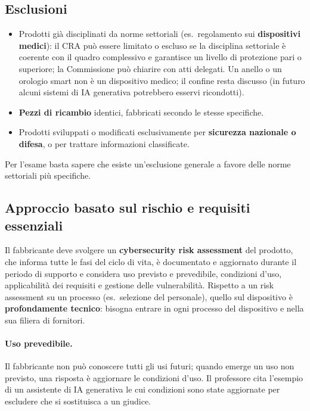 \subsection{Esclusioni}
\begin{itemize}
  \item Prodotti già disciplinati da norme settoriali (es.\ regolamento sui \textbf{dispositivi medici}):
    il CRA può essere limitato o escluso se la disciplina settoriale è coerente con il quadro complessivo e
    garantisce un livello di protezione pari o superiore; la Commissione può chiarire con atti delegati.
    Un anello o un orologio smart non è un dispositivo medico; il confine resta discusso (in futuro alcuni
    sistemi di IA generativa potrebbero esservi ricondotti).
  \item \textbf{Pezzi di ricambio} identici, fabbricati secondo le stesse specifiche.
  \item Prodotti sviluppati o modificati esclusivamente per \textbf{sicurezza nazionale o difesa}, o per
    trattare informazioni classificate.
\end{itemize}
Per l'esame basta sapere che esiste un'esclusione generale a favore delle norme settoriali più specifiche.

\subsection{Approccio basato sul rischio e requisiti essenziali}
Il fabbricante deve svolgere un \textbf{cybersecurity risk assessment} del prodotto, che informa tutte le
fasi del ciclo di vita, è documentato e aggiornato durante il periodo di supporto e considera uso previsto e
prevedibile, condizioni d'uso, applicabilità dei requisiti e gestione delle vulnerabilità. Rispetto a un
risk assessment su un processo (es.\ selezione del personale), quello sul dispositivo è
\textbf{profondamente tecnico}: bisogna entrare in ogni processo del dispositivo e nella sua filiera di
fornitori.

\paragraph{Uso prevedibile.} Il fabbricante non può conoscere tutti gli usi futuri; quando emerge un uso non
previsto, una risposta è aggiornare le condizioni d'uso. Il professore cita l'esempio di un assistente di
IA generativa le cui condizioni sono state aggiornate per escludere che si sostituisca a un giudice.

